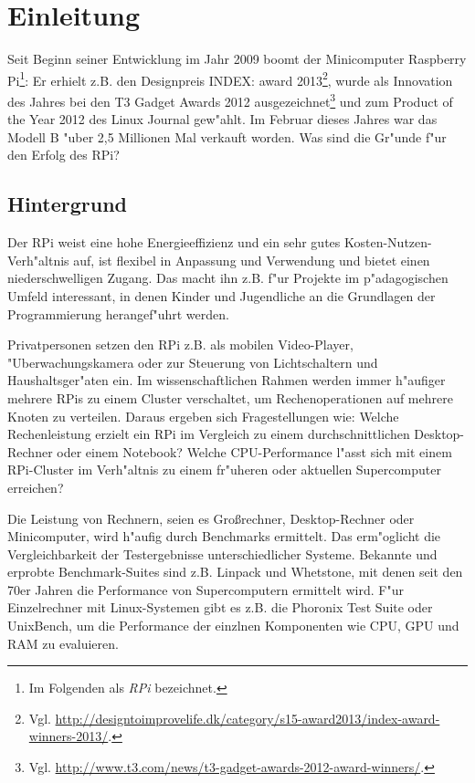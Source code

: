 \chapter{Einleitung}\label{Kapitel 1}


Seit Beginn seiner Entwicklung im Jahr 2009 boomt der Minicomputer Raspberry Pi\footnote{Im Folgenden als \textit{RPi} bezeichnet.}: Er erhielt z.B. den Designpreis INDEX: award 2013\footnote{Vgl. \url{http://designtoimprovelife.dk/category/s15-award2013/index-award-winners-2013/}.}, wurde als Innovation des Jahres bei den T3 Gadget Awards 2012 ausgezeichnet\footnote{Vgl. \url{http://www.t3.com/news/t3-gadget-awards-2012-award-winners/}.}
und zum Product of the Year 2012 des Linux Journal gew"ahlt. 
Im Februar dieses Jahres war das Modell B "uber 2,5 Millionen Mal verkauft worden. Was sind die Gr"unde f"ur den Erfolg des RPi? 

\section{Hintergrund}\label{Hintergrund}

Der RPi weist eine hohe Energieeffizienz und ein sehr gutes Kosten-Nutzen-Verh"altnis auf, ist flexibel in Anpassung und Verwendung und bietet einen niederschwelligen Zugang. Das macht ihn z.B. f"ur Projekte im p"adagogischen Umfeld interessant, in denen Kinder und Jugendliche an die Grundlagen der Programmierung herangef"uhrt werden. 

Privatpersonen setzen den RPi z.B. als mobilen Video-Player, "Uberwachungskamera oder zur Steuerung von Lichtschaltern und Haushaltsger"aten ein. Im wissenschaftlichen Rahmen werden immer h"aufiger mehrere RPis zu einem Cluster verschaltet, um Rechenoperationen auf mehrere Knoten zu verteilen. Daraus ergeben sich Fragestellungen wie: Welche Rechenleistung erzielt ein RPi im Vergleich zu einem durchschnittlichen Desktop-Rechner oder einem Notebook? Welche CPU-Performance l"asst sich mit einem RPi-Cluster im Verh"altnis zu einem fr"uheren oder aktuellen Supercomputer erreichen? 

Die Leistung von Rechnern, seien es Gro\ss rechner, Desktop-Rechner oder Minicomputer, wird h"aufig durch Benchmarks ermittelt. Das erm"oglicht die Vergleichbarkeit der Testergebnisse unterschiedlicher Systeme. Bekannte und erprobte Benchmark-Suites sind z.B. Linpack und Whetstone, mit denen seit den 70er Jahren die Performance von Supercomputern ermittelt wird. F"ur Einzelrechner mit Linux-Systemen gibt es z.B. die Phoronix Test Suite oder UnixBench, um die Performance der einzlnen Komponenten wie CPU, GPU und RAM zu evaluieren. 

